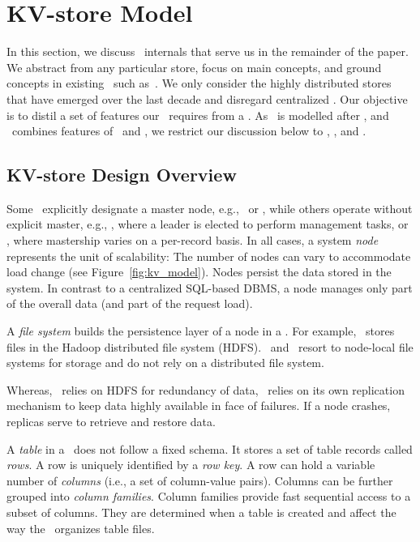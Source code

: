 \section{KV-store Model}
\label{sec:kv_model}

In this section, we discuss \KVS\ internals that serve us in the
remainder of the paper.  We abstract from any particular store, focus
on main concepts, and ground concepts in existing \KVSs\ such
as~\cite{chang:bigtable, decandia:dynamo, cooper:pnuts, george:hbase,
  hewitt:cassandra}. We only consider the highly distributed stores
that have emerged over the last decade and disregard centralized
\KVSs.  Our objective is to distil a set of features our
\VMS\ requires from a \KVS. As \HB\ is modelled after \BT, and
\CAS\ combines features of \DY\ and \BT, we restrict our discussion
below to \HB, \CAS, and \PN.

\subsection{KV-store Design Overview}

Some \KVSs\ explicitly designate a master node, e.g., \HB\ or \BT,
while others operate without explicit master, e.g., \CAS, where a
leader is elected to perform management tasks, or \PN, where
mastership varies on a per-record basis.  In all cases, a system
\textit{node} represents the unit of scalability: The number of nodes
can vary to accommodate load change (see Figure~\ref{fig:kv_model}).
Nodes persist the data stored in the system. In contrast to a
centralized SQL-based DBMS, a node manages only part of the overall
data (and part of the request load).

A \textit{file system} builds the persistence layer of a node in a
\KVS. For example, \HB\ stores files in the Hadoop distributed file
system (HDFS). \CAS\ and \PN\ resort to node-local file systems for
storage and do not rely on a distributed file system.

Whereas, \HB\ relies on HDFS for redundancy of data, \CAS\ relies on
its own replication mechanism to keep data highly available in face of
failures.  If a node crashes, replicas serve to retrieve and restore
data.

A \textit{table} in a \KVS\ does not follow a fixed schema. It stores
a set of table records called \textit{rows}. A row is uniquely
identified by a \textit{row key}. A row can hold a variable number of
\textit{columns} (i.e., a set of column-value pairs). Columns can be
further grouped into \textit{column families}. Column families provide
fast sequential access to a subset of columns. They are determined
when a table is created and affect the way the \KVS\ organizes table
files.

